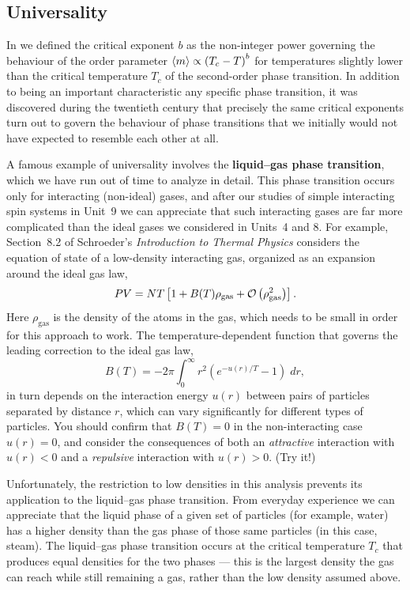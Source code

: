 \subsection{Universality}
In  we defined the critical exponent $b$ as the non-integer power governing the behaviour of the order parameter $\left\langle m \right\rangle \propto \left(T_c - T\right)^b$ for temperatures slightly lower than the critical temperature $T_c$ of the second-order phase transition.
In addition to being an important characteristic any specific phase transition, it was discovered during the twentieth century that precisely the same critical exponents turn out to govern the behaviour of phase transitions that we initially would not have expected to resemble each other at all.

A famous example of universality involves the \textbf{liquid--gas phase transition}, which we have run out of time to analyze in detail.
This phase transition occurs only for interacting (non-ideal) gases, and after our studies of simple interacting spin systems in Unit~9 we can appreciate that such interacting gases are far more complicated than the ideal gases we considered in Units~4 and 8.
For example, Section~8.2 of Schroeder's \textit{Introduction to Thermal Physics} considers the equation of state of a low-density interacting gas, organized as an expansion around the ideal gas law,
\begin{equation*}
  PV = NT\left[1 + B(T) \rho_{\text{gas}} + \mathcal O\left(\rho_{\text{gas}}^2\right)\right].
\end{equation*}
Here $\rho_{\text{gas}}$ is the density of the atoms in the gas, which needs to be small in order for this approach to work.
The temperature-dependent function that governs the leading correction to the ideal gas law,
\begin{equation*}
  B(T) = -2\pi \int_0^{\infty} r^2 \left(e^{-u(r) / T} - 1\right) \; dr,
\end{equation*}
in turn depends on the interaction energy $u(r)$ between pairs of particles separated by distance $r$, which can vary significantly for different types of particles.
You should confirm that $B(T) = 0$ in the non-interacting case $u(r) = 0$, and consider the consequences of both an \textit{attractive} interaction with $u(r) < 0$ and a \textit{repulsive} interaction with $u(r) > 0$.
(Try it!)

Unfortunately, the restriction to low densities in this analysis prevents its application to the liquid--gas phase transition.
From everyday experience we can appreciate that the liquid phase of a given set of particles (for example, water) has a higher density than the gas phase of those same particles (in this case, steam).
The liquid--gas phase transition occurs at the critical temperature $T_c$ that produces equal densities for the two phases --- this is the largest density the gas can reach while still remaining a gas, rather than the low density assumed above.

